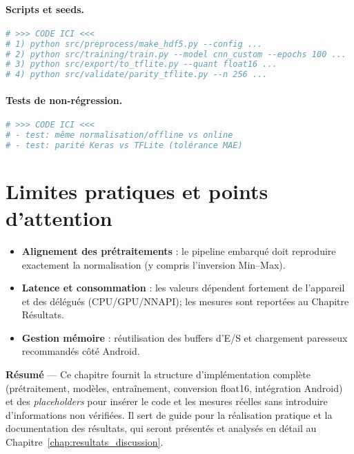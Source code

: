 \paragraph{Scripts et seeds.}
\begin{lstlisting}[language=bash,caption={(Placeholder) Exécution bout-en-bout},label={lst:run_all}]
# >>> CODE ICI <<<
# 1) python src/preprocess/make_hdf5.py --config ...
# 2) python src/training/train.py --model cnn_custom --epochs 100 ...
# 3) python src/export/to_tflite.py --quant float16 ...
# 4) python src/validate/parity_tflite.py --n 256 ...
\end{lstlisting}

\paragraph{Tests de non-régression.}
\begin{lstlisting}[language=Python,caption={(Placeholder) Tests unitaires/parité sortie},label={lst:tests}]
# >>> CODE ICI <<<
# - test: même normalisation/offline vs online
# - test: parité Keras vs TFLite (tolérance MAE)
\end{lstlisting}

\section{Limites pratiques et points d’attention}
\label{sec:limites}
\begin{itemize}
    \item \textbf{Alignement des prétraitements} : le pipeline embarqué doit reproduire exactement la normalisation (y compris l’inversion Min--Max).
    \item \textbf{Latence et consommation} : les valeurs dépendent fortement de l’appareil et des délégués (CPU/GPU/NNAPI); les mesures sont reportées au Chapitre Résultats.
    \item \textbf{Gestion mémoire} : réutilisation des buffers d’E/S et chargement paresseux recommandés côté Android.
\end{itemize}

\bigskip
\noindent \textbf{Résumé} — Ce chapitre fournit la structure d’implémentation complète (prétraitement, modèles, entraînement, conversion float16, intégration Android) et des \textit{placeholders} pour insérer le code et les mesures réelles sans introduire d’informations non vérifiées.
Il sert de guide pour la réalisation pratique et la documentation des résultats, qui seront présentés et analysés en détail au Chapitre~\ref{chap:resultats_discussion}.